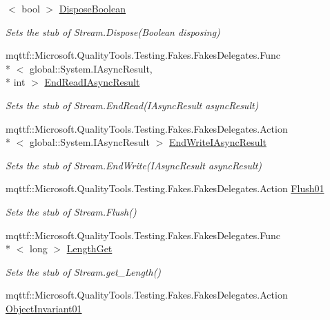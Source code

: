 \begin{DoxyCompactItemize}
$<$ bool $>$ \hyperlink{class_system_1_1_i_o_1_1_fakes_1_1_stub_stream_a63fae155c7edaaca604d7e8658088f75}{Dispose\-Boolean}
\begin{DoxyCompactList}\small\item\em Sets the stub of Stream.\-Dispose(\-Boolean disposing)\end{DoxyCompactList}\item 
mqttf\-::\-Microsoft.\-Quality\-Tools.\-Testing.\-Fakes.\-Fakes\-Delegates.\-Func\\*
$<$ global\-::\-System.\-I\-Async\-Result, \\*
int $>$ \hyperlink{class_system_1_1_i_o_1_1_fakes_1_1_stub_stream_a5564e380fa43efd38f0b41befeba6d7b}{End\-Read\-I\-Async\-Result}
\begin{DoxyCompactList}\small\item\em Sets the stub of Stream.\-End\-Read(\-I\-Async\-Result async\-Result)\end{DoxyCompactList}\item 
mqttf\-::\-Microsoft.\-Quality\-Tools.\-Testing.\-Fakes.\-Fakes\-Delegates.\-Action\\*
$<$ global\-::\-System.\-I\-Async\-Result $>$ \hyperlink{class_system_1_1_i_o_1_1_fakes_1_1_stub_stream_a57991c305d485e016cc3a547c81b2775}{End\-Write\-I\-Async\-Result}
\begin{DoxyCompactList}\small\item\em Sets the stub of Stream.\-End\-Write(\-I\-Async\-Result async\-Result)\end{DoxyCompactList}\item 
mqttf\-::\-Microsoft.\-Quality\-Tools.\-Testing.\-Fakes.\-Fakes\-Delegates.\-Action \hyperlink{class_system_1_1_i_o_1_1_fakes_1_1_stub_stream_a7fcac742b83b05203647c3b6de9a7c6a}{Flush01}
\begin{DoxyCompactList}\small\item\em Sets the stub of Stream.\-Flush()\end{DoxyCompactList}\item 
mqttf\-::\-Microsoft.\-Quality\-Tools.\-Testing.\-Fakes.\-Fakes\-Delegates.\-Func\\*
$<$ long $>$ \hyperlink{class_system_1_1_i_o_1_1_fakes_1_1_stub_stream_a84004248bca69acdff3b626ce53c498f}{Length\-Get}
\begin{DoxyCompactList}\small\item\em Sets the stub of Stream.\-get\-\_\-\-Length()\end{DoxyCompactList}\item 
mqttf\-::\-Microsoft.\-Quality\-Tools.\-Testing.\-Fakes.\-Fakes\-Delegates.\-Action \hyperlink{class_system_1_1_i_o_1_1_fakes_1_1_stub_stream_a5fa63d8f762a9da605571724bc206ed6}{Object\-Invariant01}

\end{DoxyCompactItemize}
